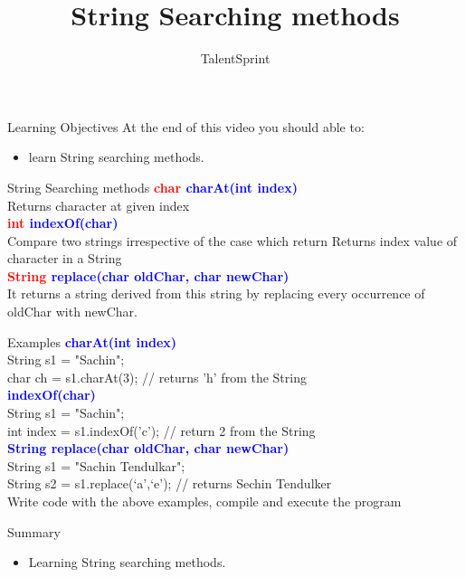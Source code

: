 \documentclass[aspectratio=169,14pt,usenames,dvipsnames]{beamer}
\title[String Searching methods]{String Searching methods}
\begin{document}
{\1
\begin{frame} \vspace{35pt}

\subtitle{TalentSprint}
\maketitle
\end{frame}
}

\begin{frame}{Learning Objectives}
At the end of this video you should able to:
\begin{itemize}
\item learn String searching methods.
\end{itemize}
\end{frame}

\begin{frame}{String Searching methods}
\textbf{\textcolor{red}{char} \textcolor{blue}{charAt(int index)}}\\
Returns character at given index\\
\vspace{1em}
\textbf{\textcolor{red}{int} \textcolor{blue}{indexOf(char)}}\\
Compare two strings irrespective of the case which return Returns index value of character in a String\\
\vspace{1em}
\textbf{\textcolor{red}{String} \textcolor{blue}{replace(char oldChar, char newChar)}}\\
It returns a string derived from this string by replacing
every occurrence of oldChar with newChar.
\end{frame}


\begin{frame}{Examples}
\textbf{\textcolor{blue}{charAt(int index)}}\\
String s1 = "Sachin";\\
char ch = s1.charAt(3); // returns ’h’ from the String\\
\textbf{\textcolor{blue}{indexOf(char)}}\\
String s1 = "Sachin";\\
int index = s1.indexOf(’c’); // return 2 from the String\\
\textbf{\textcolor{blue}{String replace(char oldChar, char newChar)}}\\
String s1 = "Sachin Tendulkar";\\
String s2 = s1.replace(‘a’,‘e’); // returns Sechin Tendulker\\
\color{red}Write code with the above examples, compile and execute the program
\end{frame}




\begin{frame}{Summary}
\begin{itemize}
    \item Learning String searching methods.
\end{itemize}
\end{frame}
\end{document}
